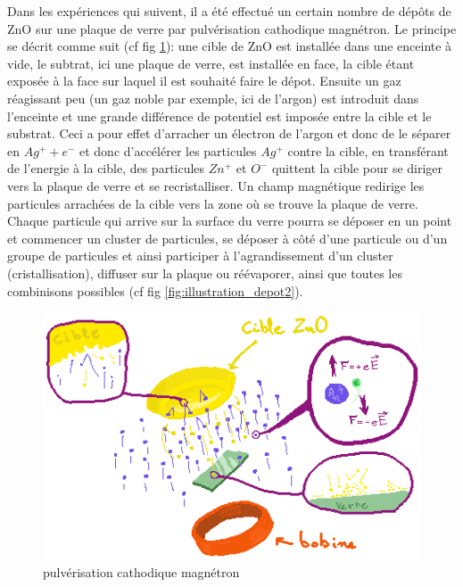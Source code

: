 \documentclass[a4paper,12pt,oneside]{article}
\begin{document}
Dans les expériences qui suivent, il a été effectué un certain nombre de dépôts de ZnO sur une plaque de verre par pulvérisation cathodique magnétron. Le principe se décrit comme suit (cf fig \ref{fig:illustration_depot}): une cible de ZnO est installée dans une enceinte à vide, le subtrat, ici une plaque de verre, est installée en face, la cible étant exposée à la face sur laquel il est souhaité faire le dépot. Ensuite un gaz réagissant peu (un gaz noble par exemple, ici de l'argon) est introduit dans l'enceinte et une grande différence de potentiel est imposée entre la cible et le substrat. Ceci a pour effet d'arracher un électron de l'argon et donc de le séparer en $Ag^+ + e^-$ et donc d'accélérer les particules $Ag^+$ contre la cible, en transférant de l'energie à la cible, des particules $Zn^+$ et $O^-$ quittent la cible pour se diriger vers la plaque de verre et se recristalliser. Un champ magnétique redirige les particules arrachées de la cible vers la zone où se trouve la plaque de verre. Chaque particule qui arrive sur la surface du verre pourra se déposer en un point et commencer un cluster de particules, se déposer à côté d'une particule ou d'un groupe de particules et ainsi participer à l'agrandissement d'un cluster (cristallisation), diffuser sur la plaque ou réévaporer, ainsi que toutes les combinisons possibles (cf fig \ref{fig:illustration_depot2}).

\begin{figure}[h!]
	\begin{center}
	\includegraphics[width=1.\linewidth,angle=0]{./figures/illustration_depot.png}
	\caption{pulvérisation cathodique magnétron} \label{fig:illustration_depot}
	\end{center}
\end{figure}
\end{document}
